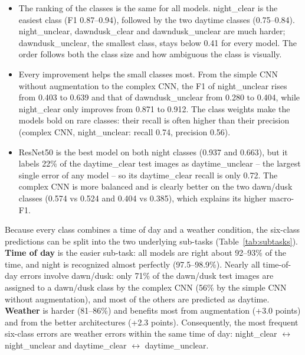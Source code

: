 \documentclass[12pt,letterpaper]{article}
\begin{document}
\begin{itemize}
  \item The ranking of the classes is the same for all models. night\_clear is the easiest class (F1 0.87--0.94),
        followed by the two daytime classes (0.75--0.84). night\_unclear, dawndusk\_clear and dawndusk\_unclear are
        much harder; dawndusk\_unclear, the smallest class, stays below 0.41 for every model. The order follows both
        the class size and how ambiguous the class is visually.
  \item Every improvement helps the small classes most. From the simple CNN without augmentation to the complex CNN,
        the F1 of night\_unclear rises from 0.403 to 0.639 and that of dawndusk\_unclear from 0.280 to 0.404, while
        night\_clear only improves from 0.871 to 0.912. The class weights make the models bold on rare classes:
        their recall is often higher than their precision (complex CNN, night\_unclear: recall 0.74, precision 0.56).
  \item ResNet50 is the best model on both night classes (0.937 and 0.663), but it labels 22\% of the daytime\_clear
        test images as daytime\_unclear -- the largest single error of any model -- so its daytime\_clear recall is
        only 0.72. The complex CNN is more balanced and is clearly better on the two dawn/dusk classes (0.574 vs 0.524
        and 0.404 vs 0.385), which explains its higher macro-F1.
\end{itemize}

Because every class combines a time of day and a weather condition, the six-class predictions can be split into the
two underlying sub-tasks (Table~\ref{tab:subtasks}). \textbf{Time of day} is the easier sub-task: all models are right
about 92--93\% of the time, and night is recognized almost perfectly (97.5--98.9\%). Nearly all time-of-day errors
involve dawn/dusk: only 71\% of the dawn/dusk test images are assigned to a dawn/dusk class by the complex CNN (56\% by
the simple CNN without augmentation), and most of the others are predicted as daytime. \textbf{Weather} is harder
(81--86\%) and benefits most from augmentation (+3.0 points) and from the better architectures (+2.3 points).
Consequently, the most frequent six-class errors are weather errors within the same time of day: night\_clear
$\leftrightarrow$ night\_unclear and daytime\_clear $\leftrightarrow$ daytime\_unclear.
\end{document}
